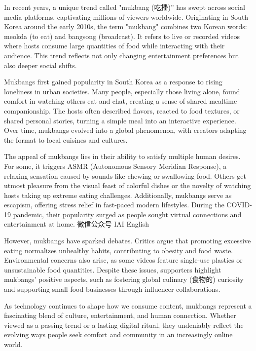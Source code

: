 \documentclass{英语试卷}
\begin{document}
\par In recent years, a unique trend called "mukbang (吃播)” has swept across social media platforms, captivating millions of viewers worldwide. Originating in South Korea around the early 2010s, the term "mukbang" combines two Korean words: meokda (to eat) and bangsong (broadcast). It refers to live or recorded videos where hosts consume large quantities of food while interacting with their audience. This trend reflects not only changing entertainment preferences but also deeper social shifts.\par
\par Mukbangs first gained popularity in South Korea as a response to rising loneliness in urban societies. Many people, especially those living alone, found comfort in watching others eat and chat, creating a sense of shared mealtime companionship. The hosts often described flavors, reacted to food textures, or shared personal stories, turning a simple meal into an interactive experience. Over time, mukbangs evolved into a global phenomenon, with creators adapting the format to local cuisines and cultures.\par
\par The appeal of mukbangs lies in their ability to satisfy multiple human desires. For some, it triggers ASMR (Autonomous Sensory Meridian Response), a relaxing sensation caused by sounds like chewing or swallowing food. Others get utmost pleasure from the visual feast of colorful dishes or the novelty of watching hosts taking up extreme eating challenges. Additionally, mukbangs serve as escapism, offering stress relief in fast-paced modern lifestyles. During the COVID-19 pandemic, their popularity surged as people sought virtual connections and entertainment at home. 微信公众号 IAI English\par
\par However, mukbangs have sparked debates. Critics argue that promoting excessive eating normalizes unhealthy habits, contributing to obesity and food waste. Environmental concerns also arise, as some videos feature single-use plastics or unsustainable food quantities. Despite these issues, supporters highlight mukbangs' positive aspects, such as fostering global culinary (食物的) curiosity and supporting small food businesses through influencer collaborations.\par
\par As technology continues to shape how we consume content, mukbangs represent a fascinating blend of culture, entertainment, and human connection. Whether viewed as a passing trend or a lasting digital ritual, they undeniably reflect the evolving ways people seek comfort and community in an increasingly online world.\par
\end{document}

